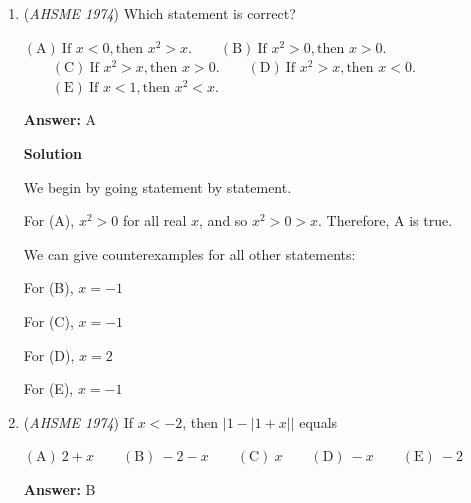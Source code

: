 \begin{enumerate}
 $\mathrm{(C) \  } \text{``If P is false then Q is true."} \qquad$ ---> If the dog is not 100\% blue, then the dog is 100\% red. Again, this fails for other colors of dogs. This is dogscrimination!

 $\mathrm{(D) \  } \text{``If Q is true then P is false."} \qquad$ ---> If the dog is 100\% red, then it is not 100\% blue. This statement makes logical sense, and is correct.

 $\mathrm{(E) \  }\text{``If Q is true then P is true."} \qquad$ --->  If the dog is 100\% red, then the dog is 100\% blue. This does not make sense, because we know the color of the dog, a dog cannot be two colors at once. Actually in quantum mechanics maybe, but not for this AHSME problem.(This example is not the best way to test this answer choice if there were a different question so mind that by TFEA)

 The statement that makes the most sense is $\boxed{\text{D}}$



	\item (\textit{AHSME 1974}) Which statement is correct?


 $\mathrm{(A)\ } \text{If } x<0, \text{then } x^2>x. \qquad \mathrm{(B) \ } \text{If } x^2>0, \text{then } x>0.$
$\qquad \mathrm{(C) \  } \text{If } x^2>x, \text{then } x>0. \qquad \mathrm{(D) \  } \text{If } x^2>x, \text{then } x<0.$
$\qquad \mathrm{(E) \  }\text{If } x<1, \text{then } x^2<x.$

 \textbf{Answer: }A



\textbf{Solution}

We begin by going statement by statement.

 For (A), $x^2>0$ for all real $x$, and so $x^2>0>x$. Therefore, $\boxed{\text{A}}$ is true.

 We can give counterexamples for all other statements:

 For (B), $x=-1$

 For (C), $x=-1$

 For (D), $x=2$

 For (E), $x=-1$



	\item (\textit{AHSME 1974}) If $x<-2$, then $|1-|1+x||$ equals 


 $\mathrm{(A)\ } 2+x \qquad \mathrm{(B) \ }-2-x \qquad \mathrm{(C) \  } x \qquad \mathrm{(D) \  } -x \qquad \mathrm{(E) \  }-2$

 \textbf{Answer: }B




\end{enumerate}

